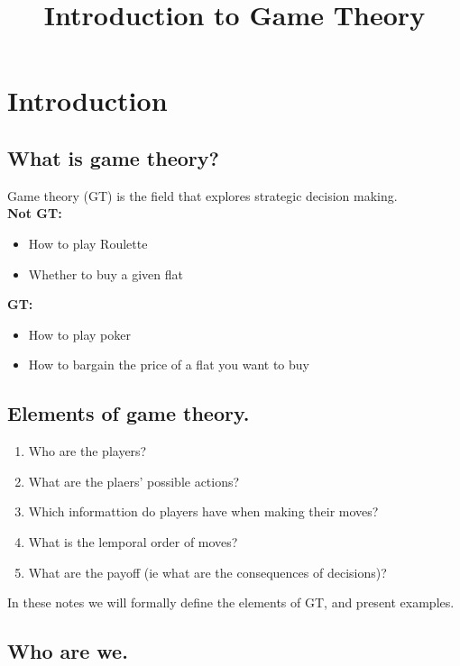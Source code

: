 \documentclass{article}
\title{Introduction to Game Theory}
\date{}
\begin{document}
\maketitle

\section{Introduction}

\subsection{What is game theory?}
Game theory (GT) is the field that explores strategic decision making. \\

\textbf{Not GT:}
\begin{itemize}
    \item How to play Roulette
    \item Whether to buy a given flat
\end{itemize}

\textbf{GT:}
\begin{itemize}
    \item How to play poker
    \item How to bargain the price of a flat you want to buy
\end{itemize}

\subsection{Elements of game theory.}

\begin{enumerate}
    \item Who are the players?
    \item What are the plaers' possible actions?
    \item Which informattion do players have when making their moves?
    \item What is the lemporal order of moves?
    \item What are the payoff (ie what are the consequences of decisions)?
\end{enumerate}

In these notes we will formally define the elements of GT, and present examples.

\subsection{Who are we.}
\end{document}

